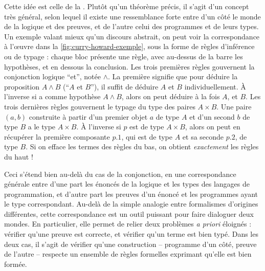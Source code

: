 Cette idée est celle de la .
Plutôt qu’un théorème précis, il s’agit d’un concept très général,
selon lequel il existe une ressemblance forte entre d’un côté le monde de la
logique et des preuves, et de l’autre celui des programmes et de leurs types.
Un exemple valant mieux qu’un discours abstrait, on peut voir la correspondance à l’œuvre dans la \cref{fig:curry-howard-exemple}, sous la forme de règles d’inférence
ou de typage : chaque bloc présente une règle, avec au-dessus de la barre les
hypothèses, et en dessous la conclusion.
Les trois premières règles gouvernent la conjonction logique “et”, notée $\wedge$.
La première signifie que pour déduire la proposition $A \wedge B$ (“$A$ et $B$”),
il suffit de déduire $A$ et $B$ individuellement.
À l’inverse si a comme hypothèse $A \wedge B$, alors on peut déduire à la fois $A$, et $B$.
Les trois dernières règles gouvernent le typage du type des paires $A \times B$.
Une paire $(a,b)$ construite à partir d’un premier objet $a$ de type $A$ et d’un second $b$
de type $B$ a le type $A \times B$.
À l’inverse si $p$ est de type $A \times B$, alors on peut en récupérer la première composante
$p.1$, qui est de type $A$ et sa seconde $p.2$, de type $B$.
Si on efface les termes des règles du bas, on obtient \emph{exactement} les règles du haut !

Ceci s’étend bien au-delà du cas de la conjonction,
en une correspondance générale entre d’une part les énoncés de la logique et les types des langages de programmation, et d’autre part les preuves d’un énoncé et les programmes ayant le type correspondant.
Au-delà de la simple analogie entre formalismes d’origines différentes, cette correspondance est un outil puissant pour faire dialoguer deux mondes.
En particulier, elle permet de relier deux problèmes \textit{a priori} éloignés :
vérifier qu’une preuve est correcte, et vérifier qu’un terme est bien typé.
Dans les deux cas, il s’agit de vérifier qu’une construction – programme d’un côté,
preuve de l’autre – respecte un ensemble de règles formelles exprimant qu’elle est
bien formée.

